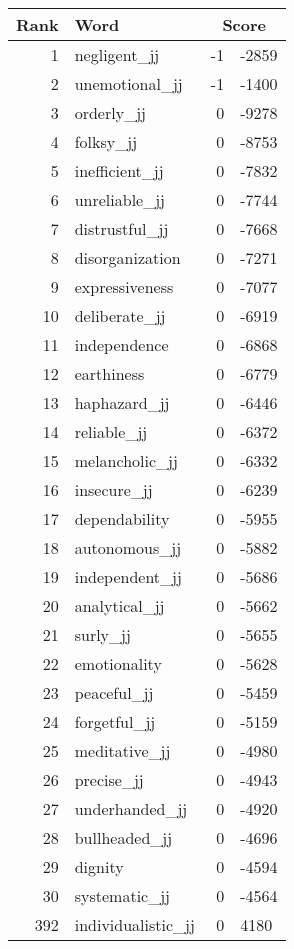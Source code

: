 \begin{longtable}[!htbp]{| rlr@{.}l |}
    \hline
    \textbf{Rank} & \textbf{Word} & \multicolumn{2}{c|}{\textbf{Score}} \\
    \hline
    \endhead
    1 & negligent\_jj & -1 & -2859 \\
    2 & unemotional\_jj & -1 & -1400 \\
    3 & orderly\_jj & 0 & -9278 \\
    4 & folksy\_jj & 0 & -8753 \\
    5 & inefficient\_jj & 0 & -7832 \\
    6 & unreliable\_jj & 0 & -7744 \\
    7 & distrustful\_jj & 0 & -7668 \\
    8 & disorganization & 0 & -7271 \\
    9 & expressiveness & 0 & -7077 \\
    10 & deliberate\_jj & 0 & -6919 \\
    11 & independence & 0 & -6868 \\
    12 & earthiness & 0 & -6779 \\
    13 & haphazard\_jj & 0 & -6446 \\
    14 & reliable\_jj & 0 & -6372 \\
    15 & melancholic\_jj & 0 & -6332 \\
    16 & insecure\_jj & 0 & -6239 \\
    17 & dependability & 0 & -5955 \\
    18 & autonomous\_jj & 0 & -5882 \\
    19 & independent\_jj & 0 & -5686 \\
    20 & analytical\_jj & 0 & -5662 \\
    21 & surly\_jj & 0 & -5655 \\
    22 & emotionality & 0 & -5628 \\
    23 & peaceful\_jj & 0 & -5459 \\
    24 & forgetful\_jj & 0 & -5159 \\
    25 & meditative\_jj & 0 & -4980 \\
    26 & precise\_jj & 0 & -4943 \\
    27 & underhanded\_jj & 0 & -4920 \\
    28 & bullheaded\_jj & 0 & -4696 \\
    29 & dignity & 0 & -4594 \\
    30 & systematic\_jj & 0 & -4564 \\
    392 & individualistic\_jj & 0 & 4180 \\

\end{longtable}
